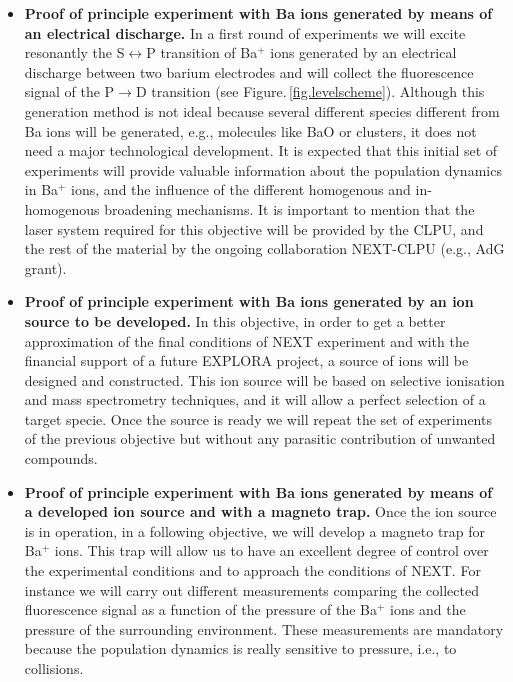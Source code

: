 \documentclass[a4paper,11pt,oneside]{article}
\begin{document}
\begin{itemize}
	\item \textbf{Proof of principle experiment with Ba ions generated by means of an electrical discharge.}
In a first round of experiments we will excite resonantly the S$\leftrightarrow$P transition of Ba$^+$ ions generated by an electrical discharge between two barium electrodes and will collect the fluorescence signal of the P$\rightarrow$D transition (see Figure.\,\ref{fig.levelscheme}). Although this generation method is not ideal because several different species different from Ba ions will be generated, e.g., molecules like BaO or clusters, it does not need a major technological development. It is expected that this initial set of experiments will provide valuable information about the population dynamics in Ba$^+$ ions, and the influence of the different homogenous and in-homogenous broadening mechanisms. It is important to mention that the laser system required for this objective will be provided by the CLPU, and the rest of the material by the ongoing collaboration NEXT-CLPU (e.g., AdG grant).

	\item \textbf{Proof of principle experiment with Ba ions generated by an ion source to be developed.}	
In this objective, in order to get a better approximation of the final conditions of NEXT experiment and with the financial support of a future EXPLORA project, a source of ions will be designed and constructed. This ion source will be based on selective ionisation and mass spectrometry techniques, and it will allow a perfect selection of a target specie. Once the source is ready we will repeat the set of experiments of the previous objective but without any parasitic contribution of unwanted compounds. 
	
	\item \textbf{Proof of principle experiment with Ba ions generated by means of a developed ion source and with a magneto trap.}	
Once the ion source is in operation, in a following objective, we will develop a magneto trap for Ba$^+$  ions. This trap will allow us to have an excellent degree of control over the experimental conditions and to approach the conditions of NEXT. For instance we will carry out different measurements comparing the collected fluorescence signal as a function of the pressure of the Ba$^+$ ions and the pressure of the surrounding environment. These measurements are mandatory because the population dynamics is really sensitive to pressure, i.e., to collisions. 
	

\end{itemize}
\end{document}
